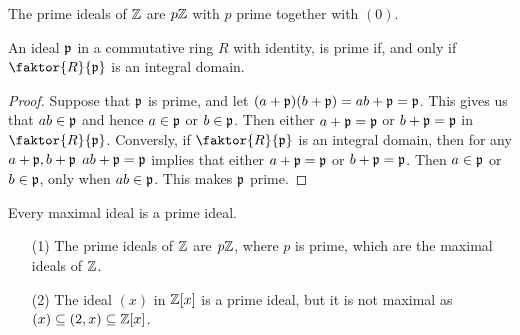 \begin{example}\label{example_5.16}
  The prime ideals of $\mathbb{Z}$ are $p\mathbb{Z}$ with  $p$ prime together with $(0)$.
\end{example}

\begin{proposition}\label{proposition_5.4.6}
  An ideal $\mathfrak{p}$ in a commutative ring $R$ with identity, is prime if, and
  only if $\faktor{R}{\pf}$ is an integral domain.
\end{proposition}
\begin{proof}
  Suppose that $\mathfrak{p}$ is prime, and let  $(a+\mathfrak{p})(b+\mathfrak{p})=ab+\mathfrak{p}=\mathfrak{p}$. This gives us
  that $ab \in \mathfrak{p}$ and hence  $a \in \mathfrak{p}$ or  $b \in \mathfrak{p}$. Then either $a+\mathfrak{p}=\mathfrak{p}$
  or $b+\mathfrak{p}=\mathfrak{p}$ in $\faktor{R}{\pf}$. Conversly, if $\faktor{R}{\pf}$ is an
  integral domain, then for any $a+\mathfrak{p},b+\mathfrak{p}$  $ab+\mathfrak{p}=\mathfrak{p}$ implies that either
  $a+\mathfrak{p}=\mathfrak{p}$ or  $b+\mathfrak{p}=\mathfrak{p}$. Then $a \in \mathfrak{p}$ or  $b \in \mathfrak{p}$, only when
  $ab \in \mathfrak{p}$. This makes  $\mathfrak{p}$ prime.
\end{proof}
\begin{corollary}
  Every maximal ideal is a prime ideal.
\end{corollary}

\begin{example}\label{example_5.17}
  \begin{enumerate}
    \item[(1)] The prime ideals of $\mathbb{Z}$ are $p\mathbb{Z}$, where $p$ is prime, which
      are the maximal ideals of $\mathbb{Z}$.

    \item[(2)] The ideal $(x)$ in $\mathbb{Z}[x]$ is a prime ideal, but it is not
      maximal as $(x) \subseteq (2,x) \subseteq \mathbb{Z}[x]$.
  \end{enumerate}
\end{example}
